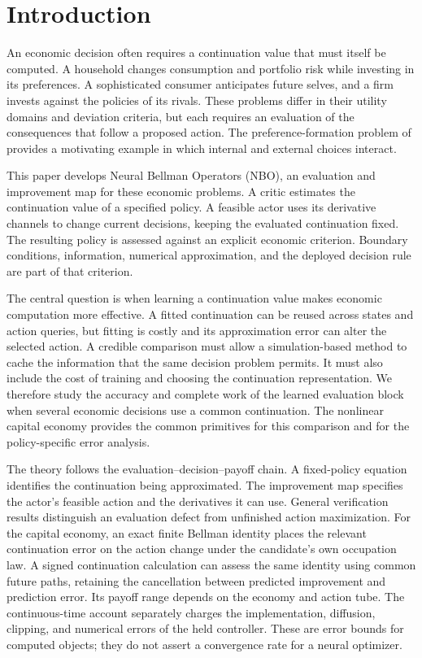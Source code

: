 \section{Introduction}\label{sec:introduction}
An economic decision often requires a continuation value that must itself be computed. A household changes consumption and portfolio risk while investing in its preferences. A sophisticated consumer anticipates future selves, and a firm invests against the policies of its rivals. These problems differ in their utility domains and deviation criteria, but each requires an evaluation of the consequences that follow a proposed action. The preference-formation problem of \citet{qi2025} provides a motivating example in which internal and external choices interact.

This paper develops Neural Bellman Operators (NBO), an evaluation and improvement map for these economic problems. A critic estimates the continuation value of a specified policy. A feasible actor uses its derivative channels to change current decisions, keeping the evaluated continuation fixed. The resulting policy is assessed against an explicit economic criterion. Boundary conditions, information, numerical approximation, and the deployed decision rule are part of that criterion.

The central question is when learning a continuation value makes economic computation more effective. A fitted continuation can be reused across states and action queries, but fitting is costly and its approximation error can alter the selected action. A credible comparison must allow a simulation-based method to cache the information that the same decision problem permits. It must also include the cost of training and choosing the continuation representation. We therefore study the accuracy and complete work of the learned evaluation block when several economic decisions use a common continuation. The nonlinear capital economy provides the common primitives for this comparison and for the policy-specific error analysis.

The theory follows the evaluation--decision--payoff chain. A fixed-policy equation identifies the continuation being approximated. The improvement map specifies the actor's feasible action and the derivatives it can use. General verification results distinguish an evaluation defect from unfinished action maximization. For the capital economy, an exact finite Bellman identity places the relevant continuation error on the action change under the candidate's own occupation law. A signed continuation calculation can assess the same identity using common future paths, retaining the cancellation between predicted improvement and prediction error. Its payoff range depends on the economy and action tube. The continuous-time account separately charges the implementation, diffusion, clipping, and numerical errors of the held controller. These are error bounds for computed objects; they do not assert a convergence rate for a neural optimizer.

